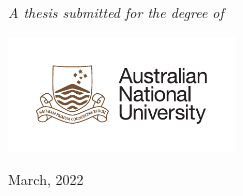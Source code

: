 \begin{titlepage}
\begin{center}
\vspace{6.3cm}

\large \textit{A thesis submitted for the degree of \degreename}\\[0.7cm] %

\vspace{0.0cm}

\groupname

\deptname %

\vspace{-0.3cm}

\univname %


\includegraphics[width=6cm]{gfx/ANU_LOGO_cmyk_56mm.pdf}

\vspace{-0.6cm}

{\normalsize March, 2022}\\[2cm] %

\end{center}
\end{titlepage}


